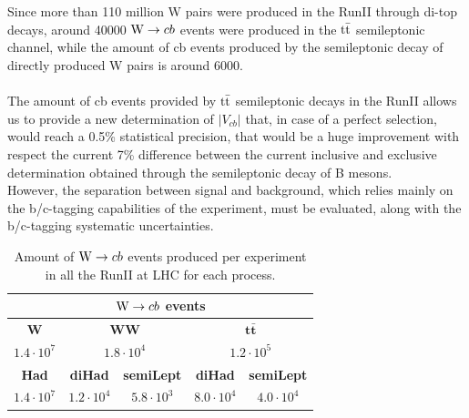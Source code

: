 \\
\\
Since more than 110 million W pairs were produced in the RunII through di-top decays, around 40000 ${\text{W}} \to cb$ events were produced in the ${{\text{t}}{\bar{\text{t}}}}$ semileptonic channel, while the amount of cb events produced by the semileptonic decay of directly produced W pairs is around 6000.\\
\\
The amount of cb events provided by ${{\text{t}}{\bar{\text{t}}}}$ semileptonic decays in the RunII allows us to provide a new determination of $|V_{cb}|$ that, in case of a perfect selection, would reach a 0.5\% statistical precision, that would be a huge improvement with respect the current 7\% difference between the current inclusive and exclusive determination obtained through the semileptonic decay of B mesons.\\
However, the separation between signal and background, which relies mainly on the b/c-tagging capabilities of the experiment, must be evaluated, along with the b/c-tagging systematic uncertainties.

\begin{table}[H]
    \centering
    \begin{tabular}{c|c|c|c|c}
        \toprule
        \multicolumn{5}{c}{${\text{W}} \to cb$ events}\\
        \midrule
        \midrule
        \textbf{W} &  \multicolumn{2}{c|}{\textbf{WW}} & \multicolumn{2}{c}{$\bm{t\bar{t}}$} \\
        \midrule
          $1.4 \cdot 10^7$&  \multicolumn{2}{c|}{$1.8 \cdot 10^4$}  &  \multicolumn{2}{c}{$1.2 \cdot 10^5$} \\
        \midrule
        \textbf{Had} & \textbf{diHad} & \textbf{semiLept} & \textbf{diHad} & \textbf{semiLept}\\
        \midrule
         $1.4 \cdot 10^7$ & $1.2\cdot 10^4$ & $5.8 \cdot 10^3$ & $8.0 \cdot 10^4$ & $4.0\cdot 10^4$ \\
         \bottomrule

    \end{tabular}
    \caption{Amount of ${\text{W}} \to cb$ events produced per experiment in all the RunII at LHC for each process.}
    \label{tab:my_label}
\end{table}